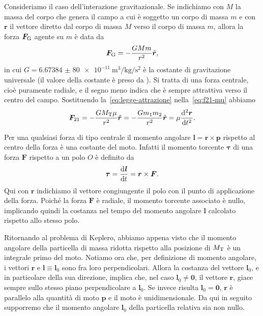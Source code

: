 Consideriamo il caso dell'interazione gravitazionale. Se indichiamo con $M$ la
massa del corpo che genera il campo a cui è soggetto un corpo di massa $m$ e con
$\bm{r}$ il vettore diretto dal corpo di massa $M$ verso il corpo di massa $m$,
allora la forza $\bm{F}_\textup{G}$ agente su $m$ è data da
\begin{equation}
  \label{eq:legge-attrazione}
  \bm{F}_\textup{G} = -\frac{GMm}{r^2}\versor{r},
\end{equation}
in cui $G=\SI{6.673 84(80)e-11}{\cubic\metre\per\kilogram\per\second\squared}$ è
la costante di gravitazione universale (il valore della costante è preso da
\textcite{codata:costanti}). Si tratta di una forza centrale, cioè puramente
radiale, e il segno meno indica che è sempre attrattiva verso il centro del
campo. Sostituendo la~\eqref{eq:legge-attrazione} nella~\eqref{eq:f21-mu}
abbiamo
\begin{equation}
  \label{eq:forza-mu}
  \bm{F}_{21} = -\frac{GM_\textup{T}\mu}{r^2}\versor{r} =
  -\frac{Gm_1m_2}{r^2}\versor{r} = \mu\toder[2]{\bm{r}}{t}.
\end{equation}

Per una qualsiasi forza di tipo centrale il momento angolare $\bm{l} = \bm{r}
\times \bm{p}$ rispetto al centro della forza è una costante del moto. Infatti
il momento torcente $\bm{\tau}$ di una forza $\bm{F}$ rispetto a un polo $O$ è
definito da
\begin{equation}
  \bm{\tau}= \frac{{\mathop{}\!\mathrm{d}^{}}\bm{l}}{\mathop{}\!\mathrm{d} {t}^{}} = \bm{r}\times\bm{F}.
\end{equation}
Qui con $\bm{r}$ indichiamo il vettore congiungente il polo con il punto di
applicazione della forza. Poiché la forza $\bm{F}$ è radiale, il momento
torcente associato è nullo, implicando quindi la costanza nel tempo del momento
angolare $\bm{l}$ calcolato rispetto allo stesso polo.

Ritornando al problema di Keplero, abbiamo appena visto che il momento angolare
della particella di massa ridotta rispetto alla posizione di $M_\textup{T}$ è un
integrale primo del moto. Notiamo ora che, per definizione di momento angolare,
i vettori $\bm{r}$ e $\bm{l}\equiv\bm{l}_0$ sono fra loro perpendicolari. Allora
la costanza del vettore $\bm{l}_0$, e in particolare della sua direzione,
implica che, nel caso $\bm{l}_0\neq\bm{0}$, il vettore $\bm{r}$, giace sempre
sullo stesso piano perpendicolare a $\bm{l}_0$. Se invece risulta
$\bm{l}_0=\bm{0}$, $\bm{r}$ è parallelo alla quantità di moto $\bm{p}$ e il moto
è unidimensionale. Da qui in seguito supporremo che il momento angolare
$\bm{l}_0$ della particella relativa sia non nullo.

